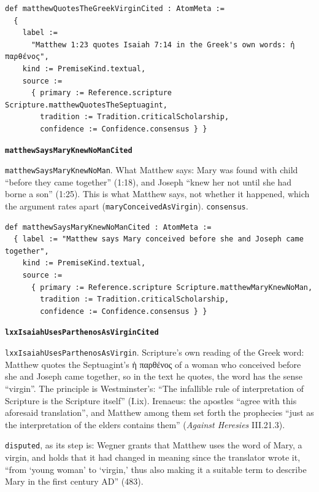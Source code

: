 \documentclass[11pt]{article}
\begin{document}
{\small\begin{verbatim}
def matthewQuotesTheGreekVirginCited : AtomMeta :=
  {
    label :=
      "Matthew 1:23 quotes Isaiah 7:14 in the Greek's own words: ἡ παρθένος",
    kind := PremiseKind.textual,
    source :=
      { primary := Reference.scripture Scripture.matthewQuotesTheSeptuagint,
        tradition := Tradition.criticalScholarship,
        confidence := Confidence.consensus } }
\end{verbatim}}
\par\medskip\noindent\textbf{\texttt{matthew\allowbreak{}Says\allowbreak{}Mary\allowbreak{}Knew\allowbreak{}No\allowbreak{}Man\allowbreak{}Cited}}\par\nobreak\noindent
\texttt{matthew\allowbreak{}Says\allowbreak{}Mary\allowbreak{}Knew\allowbreak{}No\allowbreak{}Man}. What Matthew says: Mary was found with child “before they came together” (1:18), and Joseph “knew her not until she had borne a son” (1:25). This is what Matthew says, not whether it happened, which the argument rates apart (\texttt{mary\allowbreak{}Conceived\allowbreak{}As\allowbreak{}Virgin}). \texttt{consensus}.

{\small\begin{verbatim}
def matthewSaysMaryKnewNoManCited : AtomMeta :=
  { label := "Matthew says Mary conceived before she and Joseph came together",
    kind := PremiseKind.textual,
    source :=
      { primary := Reference.scripture Scripture.matthewMaryKnewNoMan,
        tradition := Tradition.criticalScholarship,
        confidence := Confidence.consensus } }
\end{verbatim}}
\par\medskip\noindent\textbf{\texttt{lxx\allowbreak{}Isaiah\allowbreak{}Uses\allowbreak{}Parthenos\allowbreak{}As\allowbreak{}Virgin\allowbreak{}Cited}}\par\nobreak\noindent
\texttt{lxx\allowbreak{}Isaiah\allowbreak{}Uses\allowbreak{}Parthenos\allowbreak{}As\allowbreak{}Virgin}. Scripture’s own reading of the Greek word: Matthew quotes the Septuagint’s ἡ παρθένος of a woman who conceived before she and Joseph came together, so in the text he quotes, the word has the sense “virgin”. The principle is Westminster’s: “The infallible rule of interpretation of Scripture is the Scripture itself” (I.ix). Irenaeus: the apostles “agree with this aforesaid translation”, and Matthew among them set forth the prophecies “just as the interpretation of the elders contains them” (\emph{Against Heresies} III.21.3).

\texttt{disputed}, as its step is: Wegner grants that Matthew uses the word of Mary, a virgin, and holds that it had changed in meaning since the translator wrote it, “from ‘young woman’ to ‘virgin,’ thus also making it a suitable term to describe Mary in the first century AD” (483).
\end{document}
